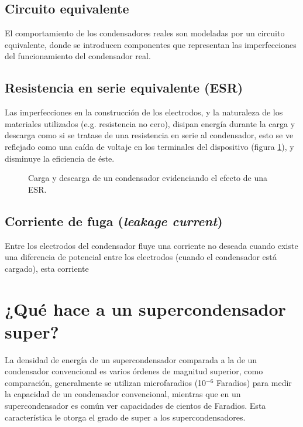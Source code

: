 \subsection{Circuito equivalente}
El comportamiento de los condensadores reales son modeladas por un circuito equivalente, donde se introducen componentes que representan las imperfecciones del funcionamiento del condensador real.\\

\subsection{Resistencia en serie equivalente (ESR)}
Las imperfecciones en la construcción de los electrodos, y la naturaleza de los materiales utilizados (e.g. resistencia no cero), disipan energía durante la carga y descarga como si se tratase de una resistencia en serie al condensador, esto se ve reflejado como una caída de voltaje en los terminales del dispositivo (figura \ref{fig:plot:charge-discharge_esr}), y disminuye la eficiencia de éste.

\begin{figure}[h!]
	\caption{Carga y descarga de un condensador evidenciando el efecto de una ESR.}
	\label{fig:plot:charge-discharge_esr}
\end{figure}

\subsection{Corriente de fuga (\emph{leakage current})}
Entre los electrodos del condensador fluye una corriente no deseada cuando existe una diferencia de potencial entre los electrodos (cuando el condensador está cargado), esta corriente 

\section{¿Qué hace a un supercondensador super?}
La densidad de energía de un supercondensador comparada a la de un condensador convencional es varios órdenes de magnitud superior, como comparación, generalmente se utilizan microfaradios (10$^{-6}$ Faradios) para medir la capacidad de un condensador convencional, mientras que en un supercondensador es común ver capacidades de cientos de Faradios. Esta característica le otorga el grado de super a los supercondensadores.

